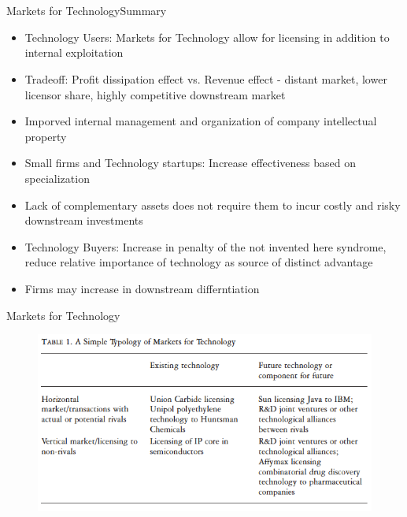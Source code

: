 \documentclass{beamer}
\begin{document}
\section{\cite{Arora2001}}
\begin{frame}{Markets for Technology}{Summary}
\begin{itemize}
\item{Technology Users: Markets for Technology allow for licensing in addition to internal exploitation}
\item{Tradeoff: Profit dissipation effect vs. Revenue effect - distant market, lower licensor share, highly competitive downstream market}
\item{Imporved internal management and organization of company intellectual property}
\item{Small firms and Technology startups: Increase effectiveness based on specialization}
\item{Lack of complementary assets does not require them to incur costly and risky downstream investments}
\item{Technology Buyers: Increase in penalty of the not invented here syndrome, reduce relative importance of technology as source of distinct advantage}
\item{Firms may increase in downstream differntiation}
\end{itemize}
\end{frame}

\begin{frame}{Markets for Technology}{}
\begin{figure}[h]
\begin{centering}
  \includegraphics[width=\textwidth]{0301}
   \label{fig:0301}
\end{centering}
\end{figure}
\end{frame}
\end{document}
